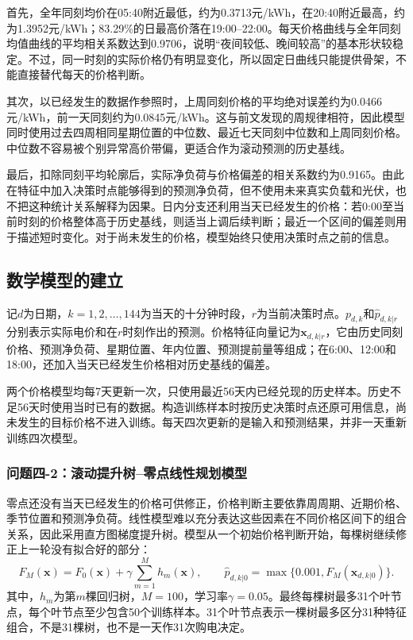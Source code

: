 \documentclass[11pt,a4paper]{article}
\begin{document}
首先，全年同刻均价在05:40附近最低，约为0.3713元/kWh，在20:40附近最高，约为1.3952元/kWh；83.29\%的日最高价落在19:00--22:00。每天价格曲线与全年同刻均值曲线的平均相关系数达到0.9706，说明“夜间较低、晚间较高”的基本形状较稳定。不过，同一时刻的实际价格仍有明显变化，所以固定日曲线只能提供骨架，不能直接替代每天的价格判断。

其次，以已经发生的数据作参照时，上周同刻价格的平均绝对误差约为0.0466元/kWh，前一天同刻约为0.0845元/kWh。这与前文发现的周规律相符，因此模型同时使用过去四周相同星期位置的中位数、最近七天同刻中位数和上周同刻价格。中位数不容易被个别异常高价带偏，更适合作为滚动预测的历史基线。

最后，扣除同刻平均轮廓后，实际净负荷与价格偏差的相关系数约为0.9165。由此在特征中加入决策时点能够得到的预测净负荷，但不使用未来真实负载和光伏，也不把这种统计关系解释为因果。日内分支还利用当天已经发生的价格：若0:00至当前时刻的价格整体高于历史基线，则适当上调后续判断；最近一个区间的偏差则用于描述短时变化。对于尚未发生的价格，模型始终只使用决策时点之前的信息。

\subsection{数学模型的建立}

记$d$为日期，$k=1,2,\ldots,144$为当天的十分钟时段，$r$为当前决策时点。$p_{d,k}$和$\widehat p_{d,k|r}$分别表示实际电价和在$r$时刻作出的预测。价格特征向量记为$\boldsymbol x_{d,k|r}$，它由历史同刻价格、预测净负荷、星期位置、年内位置、预测提前量等组成；在6:00、12:00和18:00，还加入当天已经发生价格相对历史基线的偏差。

两个价格模型均每7天更新一次，只使用最近56天内已经兑现的历史样本。历史不足56天时使用当时已有的数据。构造训练样本时按历史决策时点还原可用信息，尚未发生的目标价格不进入训练。每天四次更新的是输入和预测结果，并非一天重新训练四次模型。

\subsubsection{问题四-2：滚动提升树--零点线性规划模型}

零点还没有当天已经发生的价格可供修正，价格判断主要依靠周周期、近期价格、季节位置和预测净负荷。线性模型难以充分表达这些因素在不同价格区间下的组合关系，因此采用直方图梯度提升树。模型从一个初始价格判断开始，每棵树继续修正上一轮没有拟合好的部分：
\begin{equation}
 F_M(\boldsymbol x)=F_0(\boldsymbol x)+\gamma\sum_{m=1}^{M}h_m(\boldsymbol x),
 \qquad \widehat p_{d,k|0}=\max\{0.001,F_M(\boldsymbol x_{d,k|0})\}.
 \label{eq:q42tree}
\end{equation}
其中，$h_m$为第$m$棵回归树，$M=100$，学习率$\gamma=0.05$。最终每棵树最多31个叶节点，每个叶节点至少包含50个训练样本。31个叶节点表示一棵树最多区分31种特征组合，不是31棵树，也不是一天作31次购电决定。
\end{document}
